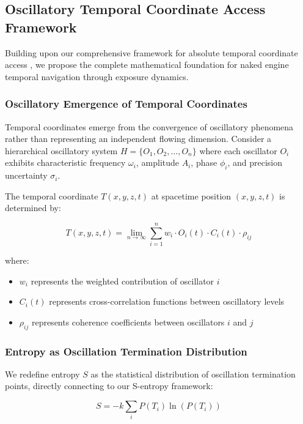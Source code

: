 \documentclass[11pt,a4paper]{article}
\theoremstyle{remark}
\begin{document}
\subsection{Oscillatory Temporal Coordinate Access Framework}

Building upon our comprehensive framework for absolute temporal coordinate access \cite{sachikonye2024temporal}, we propose the complete mathematical foundation for naked engine temporal navigation through exposure dynamics.

\subsubsection{Oscillatory Emergence of Temporal Coordinates}

Temporal coordinates emerge from the convergence of oscillatory phenomena rather than representing an independent flowing dimension. Consider a hierarchical oscillatory system $H = \{O_1, O_2, \ldots, O_n\}$ where each oscillator $O_i$ exhibits characteristic frequency $\omega_i$, amplitude $A_i$, phase $\phi_i$, and precision uncertainty $\sigma_i$.

The temporal coordinate $T(x,y,z,t)$ at spacetime position $(x,y,z,t)$ is determined by:

\begin{equation}
T(x,y,z,t) = \lim_{n \to \infty} \sum_{i=1}^{n} w_i \cdot O_i(t) \cdot C_i(t) \cdot \rho_{ij}
\end{equation}

where:
\begin{itemize}
\item $w_i$ represents the weighted contribution of oscillator $i$
\item $C_i(t)$ represents cross-correlation functions between oscillatory levels
\item $\rho_{ij}$ represents coherence coefficients between oscillators $i$ and $j$
\end{itemize}

\subsubsection{Entropy as Oscillation Termination Distribution}

We redefine entropy $S$ as the statistical distribution of oscillation termination points, directly connecting to our S-entropy framework:

\begin{equation}
S = -k \sum_i P(T_i) \ln(P(T_i))
\end{equation}
\end{document}
